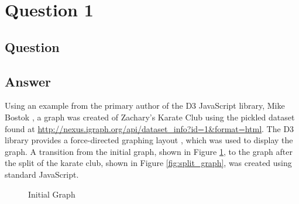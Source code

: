 \section{Question 1}

\subsection{Question}


\subsection{Answer}
Using an example from the primary author of the D3 JavaScript library, Mike Bostok \cite{d3:bostok12}, a graph was created of Zachary's Karate Club using the pickled \cite{py:pickle} dataset found at \url{http://nexus.igraph.org/api/dataset_info?id=1&format=html}. The D3 library provides a force-directed graphing layout \cite{d3:force14}, which was used to display the graph. A transition from the initial graph, shown in Figure \ref{fig:init_graph}, to the graph after the split of the karate club, shown in Figure \ref{fig:split_graph}, was created using standard JavaScript.

\begin{figure}[h!]
\centering
{}
\caption{Initial Graph}
\label{fig:init_graph}
\end{figure}

